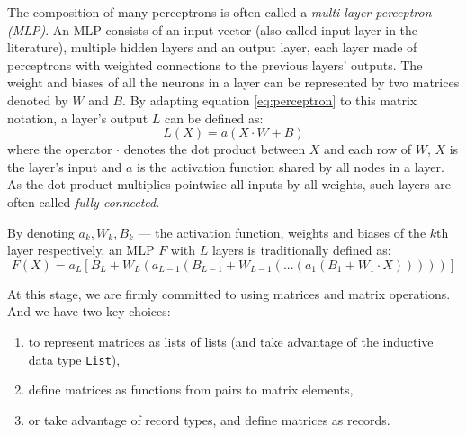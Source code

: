 \documentclass[runningheads]{llncs}
\begin{document}
The composition of many perceptrons is often called a \emph{multi-layer perceptron (MLP)}.
An MLP consists of an input vector (also called input layer in the literature),
multiple hidden layers and an output layer, each layer 
made of perceptrons with weighted connections to the previous layers' outputs. %
The weight and biases of all the neurons in a layer can be represented by two matrices denoted by $W$ and $B$. By adapting equation \ref{eq:perceptron} to this matrix notation, a layer's output $L$ can be defined as:
\begin{equation}
	L(X) = a(X \cdot W + B)
\end{equation}
where the operator $\cdot $ denotes the dot product between $X$ and each row of $W$, %
$X$ is the layer's input and $a$ is the activation function shared by all nodes in a layer. %
As the dot product multiplies pointwise all inputs by all weights, such layers are often called \emph{fully-connected}. %

By denoting $a_k, W_k, B_k$ --- the activation function, weights and biases of the $k$th layer respectively, an MLP $F$ with $L$ layers is traditionally defined as:
\begin{equation}
	F(X) = a_L[B_L + W_L (a_{L-1}(B_{L-1} + W_{L-1}(...(a_1(B_1+W_1\cdot X)))))]
      \end{equation}

      At this stage, we are firmly committed to using matrices and matrix operations. And we have two key choices:
\begin{enumerate}
\item to represent matrices as lists of lists (and take advantage of the inductive data type \lstinline{List}),
  \item define matrices as functions from pairs to matrix elements,
     \item  or take advantage of record types, and define matrices as records.  
\end{enumerate}
\end{document}
